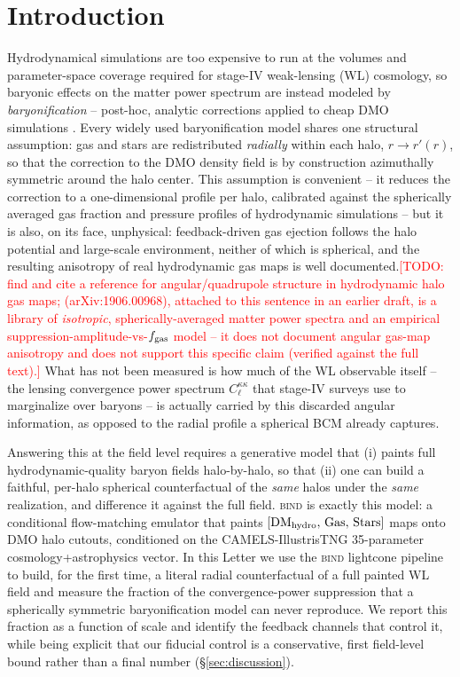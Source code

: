 \documentclass[11pt]{article}
\newcommand{\bind}{\textsc{bind}}
\newcommand{\fgas}{f_{\rm gas}}
\newcommand{\todo}[1]{\textcolor{red}{[TODO: #1]}}
\begin{document}
\section{Introduction}\label{sec:intro}

Hydrodynamical simulations are too expensive to run at the volumes and
parameter-space coverage required for stage-IV weak-lensing (WL)
cosmology, so baryonic effects on the matter power spectrum are instead
modeled by \emph{baryonification} -- post-hoc, analytic corrections
applied to cheap DMO simulations \citep{schneider_teyssier2015,
arico2020, mead2021}. Every widely used baryonification model shares one
structural assumption: gas and stars are redistributed \emph{radially}
within each halo, $r\to r'(r)$, so that the correction to the DMO density
field is by construction azimuthally symmetric around the halo center.
This assumption is convenient -- it reduces the correction to a
one-dimensional profile per halo, calibrated against the spherically
averaged gas fraction and pressure profiles of hydrodynamic simulations
-- but it is also, on its face, unphysical: feedback-driven gas ejection
follows the halo potential and large-scale environment, neither of which
is spherical, and the resulting anisotropy of real hydrodynamic
gas maps is well documented.\todo{find and cite a reference for
angular/quadrupole structure in hydrodynamic halo gas maps;
\citet{van_daalen2020} (arXiv:1906.00968), attached to this sentence in
an earlier draft, is a library of \emph{isotropic}, spherically-averaged
matter power spectra and an empirical suppression-amplitude-vs-$\fgas$
model -- it does not document angular gas-map anisotropy and does not
support this specific claim (verified against the full text).} What has
not been measured is how much of the WL observable itself -- the lensing
convergence power spectrum $C_\ell^{\kappa\kappa}$ that stage-IV surveys
use to marginalize over baryons -- is actually carried by this discarded
angular information, as opposed to the radial profile a spherical BCM
already captures.

Answering this at the field level requires a generative model that (i)
paints full hydrodynamic-quality baryon fields halo-by-halo, so that (ii)
one can build a faithful, per-halo spherical counterfactual of the
\emph{same} halos under the \emph{same} realization, and difference it
against the full field. \bind{} \citep[Paper I]{bindI} is exactly this
model: a conditional flow-matching emulator that paints
$[\mathrm{DM}_{\rm hydro},\,\mathrm{Gas},\,\mathrm{Stars}]$ maps onto DMO
halo cutouts, conditioned on the CAMELS-IllustrisTNG 35-parameter
cosmology+astrophysics vector. In this Letter we use the \bind{}
lightcone pipeline to build, for the first time, a literal radial
counterfactual of a full painted WL field and measure the fraction of the
convergence-power suppression that a spherically symmetric baryonification
model can never reproduce. We report this fraction as a function of scale
and identify the feedback channels that control it, while being explicit
that our fiducial control is a conservative, first field-level bound
rather than a final number (\S\ref{sec:discussion}).
\end{document}
